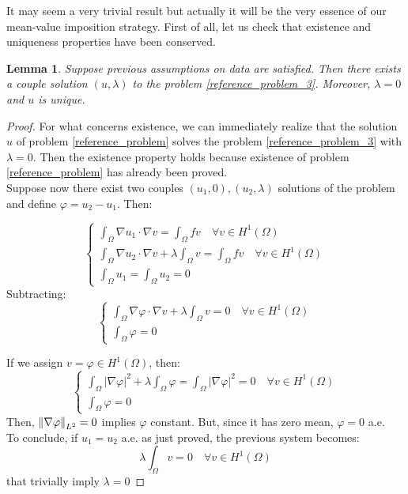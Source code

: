 \documentclass[a4paper,11pt]{article}
\newtheorem{lemma}{Lemma}
\begin{document}
\noindent It may seem a very trivial result but actually it will be the very essence of our mean-value imposition strategy. First of all, let us check that existence and uniqueness properties have been conserved.
\begin{lemma} \label{lemma_lagrange}
	Suppose previous assumptions on data are satisfied. Then there exists a couple solution $(u,\lambda)$ to the problem \ref{reference_problem_3}. Moreover, $\lambda=0$ and $u$ is unique.
\end{lemma}
\begin{proof}
	For what concerns existence, we can immediately realize that the solution $u$ of problem \ref{reference_problem} solves the problem \ref{reference_problem_3} with $\lambda=0$. Then the existence property holds because existence of problem \ref{reference_problem} has already been proved. \\
	
	\noindent Suppose now there exist two couples $(u_1,0), (u_2,\lambda)$ solutions of the problem and define $\varphi=u_2-u_1$. Then:
	
	\begin{equation*}
	\begin{cases}
	\int_{\Omega}\nabla u_1 \cdot \nabla v = \int_{\Omega} fv \quad \forall v \in H^1(\Omega) \\
	\int_{\Omega}\nabla u_2 \cdot \nabla v + \lambda \int_\Omega v = \int_{\Omega} fv \quad \forall v \in H^1(\Omega) \\
	\int_{\Omega}u_1 = \int_{\Omega}u_2 = 0
	\end{cases}
	\end{equation*}
		Subtracting:
	\begin{equation*}
	\begin{cases}
	\int_{\Omega}\nabla \varphi \cdot \nabla v + \lambda \int_\Omega v = 0 \quad \forall v \in H^1(\Omega) \\
	\int_{\Omega}\varphi = 0
	\end{cases}
	\end{equation*}
	
	\noindent If we assign $v=\varphi \in H^1(\Omega)$, then:
	\begin{equation*}
	\begin{cases}
	\int_{\Omega}|\nabla \varphi|^2 + \lambda \int_\Omega \varphi = \int_{\Omega}|\nabla \varphi|^2 = 0 \quad \forall v \in H^1(\Omega) \\
	\int_{\Omega}\varphi = 0
	\end{cases}
	\end{equation*}
	Then, $\norm{\nabla \varphi}_{L^2} = 0 $ implies $\varphi$ constant. But, since it has zero mean,  $\varphi = 0$ a.e.  \\
	To conclude, if $u_1=u_2$ a.e. as just proved, the previous system becomes:
	\begin{equation*}
	\lambda \int_{\Omega}v = 0 \quad \forall v \in H^1(\Omega)
	\end{equation*}
	that trivially imply $\lambda=0$	
\end{proof}
\end{document}
